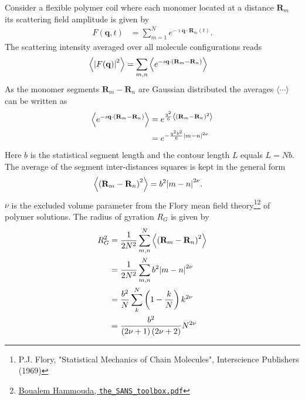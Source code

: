 Consider a flexible polymer coil where each monomer located at a
distance $\mathbf{R}_m$ its scattering field amplitude is given by
\begin{align}
F(\mathbf{q},t) &= \sum_{m=1}^N e^{-\imath
\mathbf{q}\cdot\mathbf{R}_m(t)} .
\end{align}
The scattering intensity averaged over all molecule configurations
reads
\begin{align}
\left\langle \abs{F(\mathbf{q})}^2\right\rangle
&= \sum_{m,n} \left\langle e^{-\imath\mathbf{q}\cdot(\mathbf{R}_m-\mathbf{R}_n)} \right\rangle
\end{align}
As the monomer segments $\mathbf{R}_m-\mathbf{R}_n$ are Gaussian distributed
the averages $\langle\cdots\rangle$ can be written as
\begin{subequations}
\begin{align}
\left\langle e^{-\imath\mathbf{q}\cdot(\mathbf{R}_m-\mathbf{R}_n)} \right\rangle
&= e^{\frac{q^2}{6}\left\langle \left( \mathbf{R}_m-\mathbf{R}_n\right)^2\right\rangle} \\
&= e^{-\frac{q^2b^2}{6}\abs{m-n}^{2\nu}}
\end{align}
\end{subequations}
Here $b$ is the statistical segment length and the contour length $L$ equals $L=Nb$.
The average of the segment inter-distances squares is kept in the general form
\begin{align}
\left\langle \left( \mathbf{R}_m-\mathbf{R}_n\right)^2\right\rangle
&= b^2 \abs{m-n}^{2\nu}.
\end{align}
$\nu$ is the excluded volume parameter from the Flory mean field
theory\footnote{P.J. Flory, "Statistical Mechanics of Chain Molecules", Interscience Publishers (1969)}\footnote{\href{http://www.ncnr.nist.gov/staff/hammouda/the_SANS_toolbox.pdf}{Boualem Hammouda, \texttt{the\_SANS\_toolbox.pdf}}}
of polymer solutions. The radius of gyration $R_G$ is given by
\begin{subequations}
\begin{align}
R_G^2 &= \frac{1}{2N^2}\sum_{m,n}^N \left\langle \left( \mathbf{R}_m-\mathbf{R}_n\right)^2\right\rangle \\
      &= \frac{1}{2N^2}\sum_{m,n}^N b^2 \abs{m-n}^{2\nu} \\
      &= \frac{b^2}{N} \sum_k^N \left(1-\frac{k}{N}\right) k^{2\nu} \\
      &= \frac{b^2}{\left(2\nu+1\right)\left(2\nu+2\right)} N^{2\nu}
\end{align}
\end{subequations}
